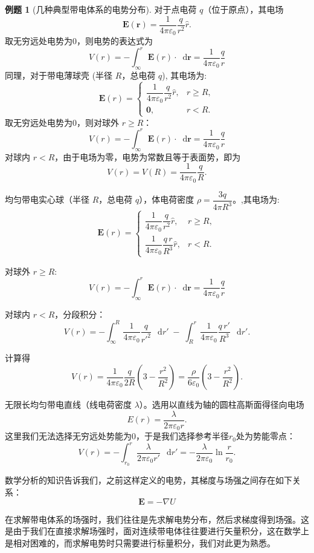 \documentclass[12pt,a4paper,oneside]{report}
\theoremstyle{definition}
\newtheorem{example}{例题}[chapter]
\theoremstyle{remark}
\renewcommand{\d}{\mathop{}\!\mathrm{d}}
\begin{document}
\begin{example}[几种典型带电体系的电势分布]

对于点电荷 \(q\)（位于原点），其电场
\[
\mathbf E(\mathbf r)=\frac{1}{4\pi\varepsilon_0}\frac{q}{r^2}\hat r.
\]
取无穷远处电势为0，则电势的表达式为
\[
V(r)=-\int_{\infty}^{r}\mathbf E(r)\cdot \d\mathbf r
=\frac{1}{4\pi\varepsilon_0}\frac{q}{r}
\]
同理，对于带电薄球壳 (半径 \(R\)，总电荷 \(q\)), 其电场为:
\[
\mathbf E(r)=
\begin{cases}
\dfrac{1}{4\pi\varepsilon_0}\dfrac{q}{r^2}\hat r, & r\ge R,\\[6pt]
\mathbf 0, & r<R.
\end{cases}
\]
取无穷远处电势为0，则对球外 \(r\ge R\)：
\[
V(r)=-\int_{\infty}^{r}\mathbf E(r)\cdot \d\mathbf r
=\frac{1}{4\pi\varepsilon_0}\frac{q}{r}
\]
对球内 \(r<R\)，由于电场为零，电势为常数且等于表面势，即为
\[
V(r)=V(R)=\frac{1}{4\pi\varepsilon_0}\frac{q}{R}.
\]

均匀带电实心球（半径 \(R\)，总电荷 \(q\)），体电荷密度 \(\rho=\dfrac{3q}{4\pi R^3}\)。,其电场为:
\[
\mathbf E(r)=
\begin{cases}
\dfrac{1}{4\pi\varepsilon_0}\dfrac{q}{r^2}\hat r, & r\ge R,\\[8pt]
\dfrac{1}{4\pi\varepsilon_0}\dfrac{q\,r}{R^3}\hat r, & r<R.
\end{cases}
\]

对球外 \(r\ge R\):
\[
V(r)=-\int_{\infty}^{r}\mathbf E(r)\cdot \d\mathbf r
=\frac{1}{4\pi\varepsilon_0}\frac{q}{r}
\]

对球内 \(r<R\)，分段积分：
\[
V(r)= -\int_{\infty}^{R}\frac{1}{4\pi\varepsilon_0}\frac{q}{r'^2}\,\d r' \;-\;\int_{R}^{r}\frac{1}{4\pi\varepsilon_0}\frac{q\,r'}{R^3}\,\d r'.
\]

计算得
\[
V(r)=\frac{1}{4\pi\varepsilon_0}\frac{q}{2R}\left(3-\frac{r^2}{R^2}\right)=\frac{\rho}{6\varepsilon_0}\left(3-\frac{r^2}{R^2}\right).
\]

无限长均匀带电直线（线电荷密度 \(\lambda\)）。选用以直线为轴的圆柱高斯面得径向电场
\[
E(r)=\frac{\lambda}{2\pi\varepsilon_0 r}.
\]
这里我们无法选择无穷远处势能为0，于是我们选择参考半径$r_0$处为势能零点：
\[
V(r)=-\int_{r_0}^{r}\frac{\lambda}{2\pi\varepsilon_0 r'}\,\d r'=-\frac{\lambda}{2\pi\varepsilon_0}\ln\frac{r}{r_0}.
\]

\end{example}

数学分析的知识告诉我们，之前这样定义的电势，其梯度与场强之间存在如下关系：
\[
\mathbf{E} = -\nabla U
\]

在求解带电体系的场强时，我们往往是先求解电势分布，然后求梯度得到场强。这是由于我们在直接求解场强时，面对连续带电体往往要进行矢量积分，这在数学上是相对困难的，而求解电势时只需要进行标量积分，我们对此更为熟悉。
\end{document}
